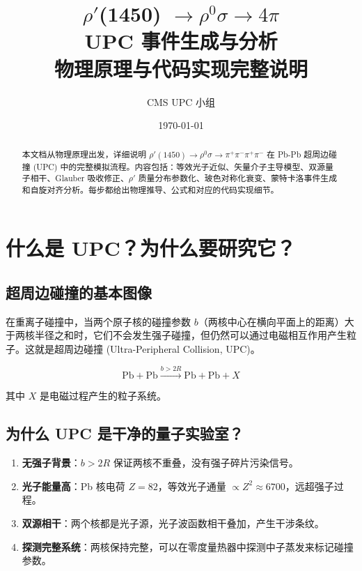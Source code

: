 \documentclass[11pt,a4paper,UTF8]{ctexart}
\title{\textbf{\huge $\rho'$(1450) $\to \rho^0 \sigma \to 4\pi$ \\ UPC 事件生成与分析} \\ \Large 物理原理与代码实现完整说明}
\author{CMS UPC 小组}
\date{\today}
\begin{document}
\maketitle

\begin{abstract}
本文档从物理原理出发，详细说明 $\rho'(1450) \to \rho^0 \sigma \to \pi^+\pi^-\pi^+\pi^-$ 在 Pb-Pb 超周边碰撞 (UPC) 中的完整模拟流程。内容包括：等效光子近似、矢量介子主导模型、双源量子相干、Glauber 吸收修正、$\rho'$ 质量分布参数化、玻色对称化衰变、蒙特卡洛事件生成和自旋对齐分析。每步都给出物理推导、公式和对应的代码实现细节。
\end{abstract}

\tableofcontents
\newpage

\section{什么是 UPC？为什么要研究它？}

\subsection{超周边碰撞的基本图像}

在重离子碰撞中，当两个原子核的碰撞参数 $b$（两核中心在横向平面上的距离）大于两核半径之和时，它们不会发生强子碰撞，但仍然可以通过电磁相互作用产生粒子。这就是超周边碰撞 (Ultra-Peripheral Collision, UPC)。

\[
\text{Pb} + \text{Pb} \xrightarrow{b > 2R} \text{Pb} + \text{Pb} + X
\]

其中 $X$ 是电磁过程产生的粒子系统。

\subsection{为什么 UPC 是干净的量子实验室？}

\begin{enumerate}[leftmargin=2em]
    \item \textbf{无强子背景}：$b > 2R$ 保证两核不重叠，没有强子碎片污染信号。
    \item \textbf{光子能量高}：Pb 核电荷 $Z=82$，等效光子通量 $\propto Z^2 \approx 6700$，远超强子过程。
    \item \textbf{双源相干}：两个核都是光子源，光子波函数相干叠加，产生干涉条纹。
    \item \textbf{探测完整系统}：两核保持完整，可以在零度量热器中探测中子蒸发来标记碰撞参数。
\end{enumerate}
\end{document}
